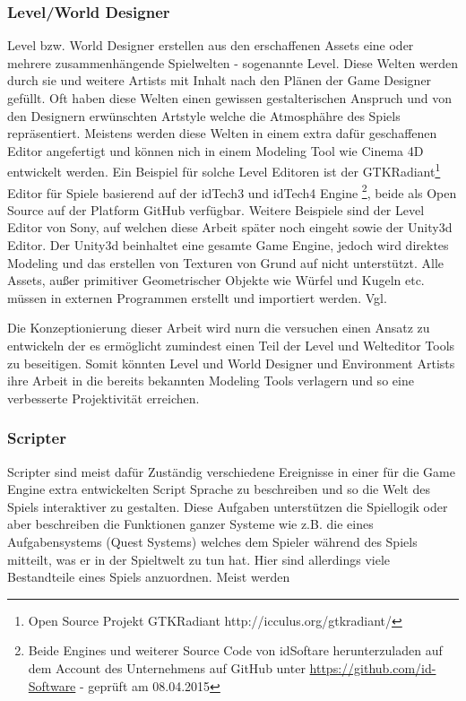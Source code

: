 \documentclass[pagesize, paper=a4, fontsize=12pt,titlepage=true, headings=small, headnosepline, abstractoff, liststotoc, nochapterprefix, plainheadsepline, twoside]{scrreprt}
\begin{document}
\subsubsection{Level/World Designer}
Level bzw. World Designer erstellen aus den erschaffenen Assets eine oder mehrere zusammenhängende Spielwelten - sogenannte Level. Diese Welten werden durch sie und weitere Artists mit Inhalt nach den Plänen der Game Designer gefüllt. Oft haben diese Welten einen gewissen gestalterischen Anspruch und von den Designern erwünschten Artstyle welche die Atmosphähre des Spiels repräsentiert. Meistens werden diese Welten in einem extra dafür geschaffenen Editor angefertigt und können nich in einem Modeling Tool wie Cinema 4D entwickelt werden. Ein Beispiel für solche Level Editoren ist der GTKRadiant\footnote{Open Source Projekt GTKRadiant http://icculus.org/gtkradiant/} Editor für Spiele basierend auf der idTech3 und idTech4  Engine \footnote{Beide Engines und weiterer Source Code von idSoftare herunterzuladen auf dem Account des Unternehmens auf GitHub unter \url{https://github.com/id-Software} - geprüft am 08.04.2015}, beide als Open Source auf der Platform GitHub verfügbar. Weitere Beispiele sind der Level Editor von Sony, auf welchen diese Arbeit später noch eingeht sowie der Unity3d Editor. Der Unity3d beinhaltet eine gesamte Game Engine, jedoch wird direktes Modeling und das erstellen von Texturen von Grund auf nicht unterstützt. Alle Assets, außer primitiver Geometrischer Objekte wie Würfel und Kugeln etc. müssen in externen Programmen erstellt und importiert werden. Vgl. \autocite[S. 31 ]{Chandler2006}

Die Konzeptionierung dieser Arbeit wird nurn die versuchen einen Ansatz zu entwickeln der es ermöglicht zumindest einen Teil der Level und Welteditor Tools zu beseitigen. Somit könnten Level und World Designer und Environment Artists ihre Arbeit in die bereits bekannten Modeling Tools verlagern und so eine verbesserte Projektivität erreichen.

\subsubsection{Scripter}
Scripter sind meist dafür Zuständig verschiedene Ereignisse in einer für die Game Engine extra entwickelten Script Sprache zu beschreiben und so die Welt des Spiels interaktiver zu gestalten. Diese Aufgaben unterstützen die Spiellogik oder aber beschreiben die Funktionen ganzer Systeme wie z.B. die eines Aufgabensystems (Quest Systems) welches dem Spieler während des Spiels mitteilt, was er in der Spieltwelt zu tun hat. Hier sind allerdings viele Bestandteile eines Spiels anzuordnen. Meist werden 
\end{document}
